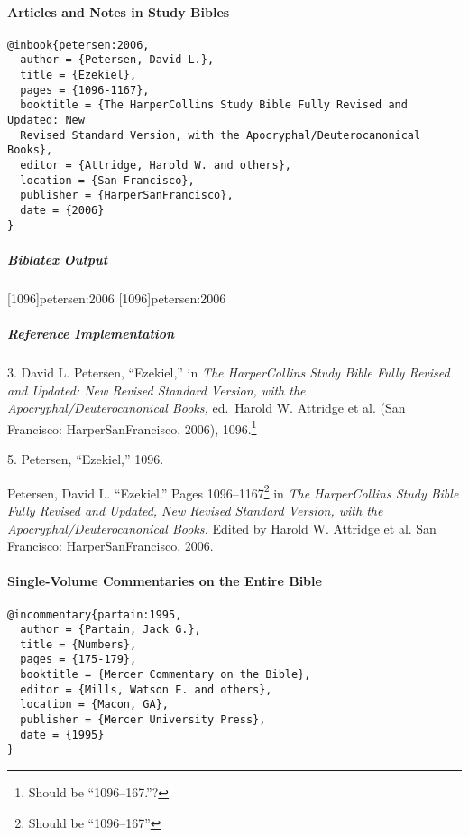 \documentclass[a4paper]{article}
\newenvironment{biboutput}{%
  \subparagraph{Biblatex Output}
}{\color{black}}
\newenvironment{refimp}{%
  \subparagraph{Reference Implementation}
  \color{reference-colour}
  \rm
}{\par\color{black}}
\begin{document}
\paragraph{Articles and Notes in Study Bibles}

\begin{lstlisting}
@inbook{petersen:2006,
  author = {Petersen, David L.},
  title = {Ezekiel},
  pages = {1096-1167},
  booktitle = {The HarperCollins Study Bible Fully Revised and Updated: New
  Revised Standard Version, with the Apocryphal/Deuterocanonical Books},
  editor = {Attridge, Harold W. and others},
  location = {San Francisco},
  publisher = {HarperSanFrancisco},
  date = {2006}
}
\end{lstlisting}

\begin{biboutput}
  [1096]{petersen:2006}
  [1096]{petersen:2006}
\end{biboutput}

\begin{refimp}
  3. David L. Petersen, “Ezekiel,” in \emph{The HarperCollins Study Bible
  Fully Revised and Updated: New Revised Standard Version, with the
  Apocryphal\slash Deuterocanonical Books,} ed.\ Harold W. Attridge et al.
  (San Francisco: HarperSanFrancisco, 2006), 1096.\footnote{Should be
  “1096–167.”?}

  5. Petersen, “Ezekiel,” 1096.

  \hangindent\bibindent Petersen, David L. “Ezekiel.” Pages
  1096–1167\footnote{Should be “1096–167”} in \emph{The HarperCollins Study
  Bible Fully Revised and Updated, New Revised Standard Version, with the
  Apocryphal/Deuterocanonical Books.} Edited by Harold W. Attridge et al. San
  Francisco: HarperSanFrancisco, 2006.
\end{refimp}

\paragraph{Single-Volume Commentaries on the Entire Bible}

\begin{lstlisting}
@incommentary{partain:1995,
  author = {Partain, Jack G.},
  title = {Numbers},
  pages = {175-179},
  booktitle = {Mercer Commentary on the Bible},
  editor = {Mills, Watson E. and others},
  location = {Macon, GA},
  publisher = {Mercer University Press},
  date = {1995}
}
\end{lstlisting}
\end{document}
